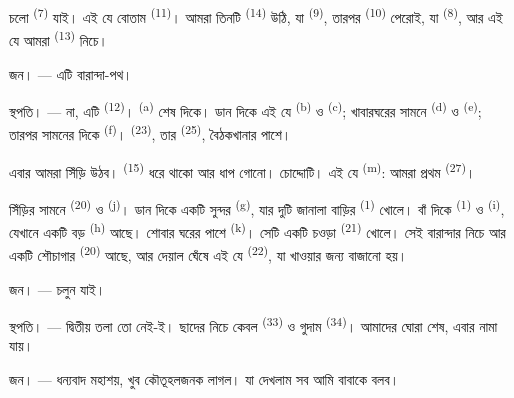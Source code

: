 চলো  \textsuperscript{(7)} যাই। এই যে  বোতাম
\textsuperscript{(11)}। আমরা তিনটি  \textsuperscript{(14)} উঠি, যা
 \textsuperscript{(9)}, তারপর 
\textsuperscript{(10)} পেরোই, যা  \textsuperscript{(8)}, আর
এই যে আমরা  \textsuperscript{(13)} নিচে।

\textsc{জন}। --- এটি বারান্দা-পথ।

\textsc{স্থপতি}। --- না, এটি  \textsuperscript{(12)}।
 \textsuperscript{(a)} শেষ দিকে। ডান দিকে এই যে
 \textsuperscript{(b)} ও  \textsuperscript{(c)};
খাবারঘরের সামনে  \textsuperscript{(d)} ও 
\textsuperscript{(e)}; তারপর সামনের দিকে  \textsuperscript{(f)}।
 \textsuperscript{(23)}, তার 
\textsuperscript{(25)}, বৈঠকখানার পাশে।

এবার আমরা সিঁড়ি উঠব।  \textsuperscript{(15)} ধরে থাকো আর ধাপ
গোনো। চোদ্দোটি। এই যে  \textsuperscript{(m)}: আমরা প্রথম
 \textsuperscript{(27)}।

\VUsaut{3.0mm}
\VUsaut{3.0mm}

সিঁড়ির সামনে  \textsuperscript{(20)} ও 
\textsuperscript{(j)}। ডান দিকে একটি সুন্দর 
\textsuperscript{(g)}, যার দুটি জানালা বাড়ির 
\textsuperscript{(1)} খোলে। বাঁ দিকে  \textsuperscript{(1)} ও
 \textsuperscript{(i)}, যেখানে একটি বড় 
\textsuperscript{(h)} আছে। শোবার ঘরের পাশে 
\textsuperscript{(k)}। সেটি একটি চওড়া 
\textsuperscript{(21)} খোলে। সেই বারান্দার নিচে আর একটি শৌচাগার
\textsuperscript{(20)} আছে, আর দেয়াল ঘেঁষে এই যে 
\textsuperscript{(22)}, যা খাওয়ার জন্য বাজানো হয়।

\textsc{জন}। --- চলুন  যাই।

\textsc{স্থপতি}। --- দ্বিতীয় তলা তো নেই-ই। ছাদের নিচে কেবল
 \textsuperscript{(33)} ও গুদাম \textsuperscript{(34)}। আমাদের
ঘোরা শেষ, এবার নামা যায়।

\textsc{জন}। --- ধন্যবাদ মহাশয়, খুব কৌতূহলজনক লাগল। যা দেখলাম সব আমি বাবাকে
বলব।
\VUsaut{4.0mm}
\VUfilet{22mm}
